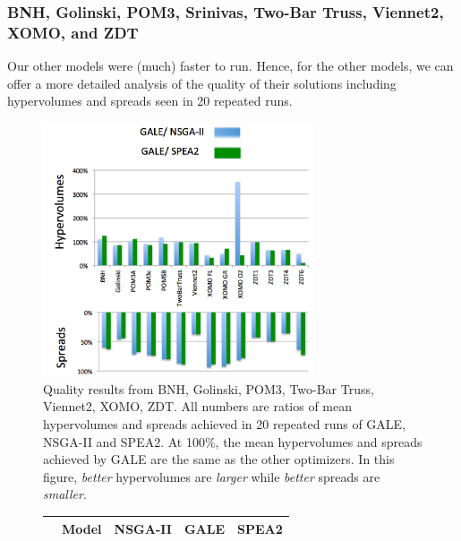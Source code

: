 \documentclass[10pt,journal,compsoc]{IEEEtran}
\newenvironment{changed}{\par}{\par}
\begin{document}
\begin{changed}
\subsubsection{BNH, Golinski, POM3, 
Srinivas, 
Two-Bar Truss, Viennet2, XOMO, and ZDT}

Our other models   were (much)
faster to run.  Hence, for  the other models, we
can offer a more detailed analysis of the quality of
their solutions including hypervolumes and spreads
seen in 20 repeated runs.
\begin{figure}
\includegraphics[width=3.15in]{mathsModelsResults.png}
\caption{Quality results from BNH, Golinski, POM3, Two-Bar Truss, Viennet2, XOMO, ZDT.
All numbers are ratios of mean hypervolumes and spreads achieved in 20 repeated runs of GALE, NSGA-II and SPEA2.
At 100\%, the mean hypervolumes and spreads achieved by GALE are the same as the other optimizers.
In this figure,  {\em better} hypervolumes are {\em larger} while {\em better} spreads are {\em smaller}.}\label{fig:rmodels}
\end{figure}
\begin{figure}[!t]
\scriptsize
\centering
\begin{tabular}{|r|c|c|c|c|} \hline
	&	Model	&	NSGA-II	&	GALE	&	SPEA2	\\ \hline

\end{tabular}
\end{figure}
\end{changed}
\end{document}
